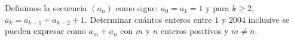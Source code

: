 Definimos la secuencia $(a_n)$ como sigue: $a_0=a_1=1$ y para $k\ge 2$, $a_k=a_{k-1}+a_{k-2}+1$.
Determinar cuántos enteros entre $1$ y $2004$ inclusive se pueden expresar como $a_m+a_n$ con $m$ y $n$ enteros positivos y $m\neq n$.
